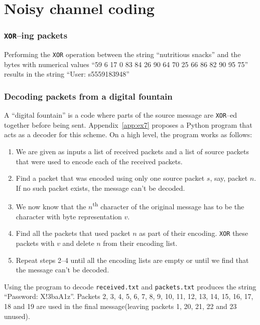 \documentclass[10pt,a4paper,oneside,onecolumn]{article}
\newcommand*{\receivedTXT}{{\tt received.txt}\xspace}
\newcommand*{\packetsTXT}{{\tt packets.txt}\xspace}
\newcommand*{\XOR}{{\tt XOR}\xspace}
\begin{document}
\part{Noisy channel coding}


\section{\XOR--ing packets}\label{sec:ex6}

Performing the \XOR operation between the string ``nutritious snacks'' and the
bytes with numerical values ``59 6 17 0 83 84 26 90 64 70 25 66 86 82 90 95 75''
results in the string ``User: s5559183948''


\section{Decoding packets from a digital fountain}\label{sec:ex7}

A ``digital fountain'' is a code where parts of the source message are \XOR--ed
together before being sent. Appendix~\ref{app:ex7} proposes a Python program
that acts as a decoder for this scheme. On a high level, the program works as
follows:

\begin{enumerate}
\item We are given as inputs a list of received packets and a list of source
      packets that were used to encode each of the received packets.
\item Find a packet that was encoded using only one source packet $s$, say,
      packet $n$.  If no such packet exists, the message can't be decoded.
\item We now know that the $n$\textsuperscript{th} character of the original
      message has to be the character with byte representation $v$.
\item Find all the packets that used packet $n$ as part of their encoding.
      \XOR these packets with $v$ and delete $n$ from their encoding list.
\item Repeat steps 2--4 until all the encoding lists are empty or until we find
      that the message can't be decoded.
\end{enumerate}

Using the program to decode \receivedTXT and \packetsTXT produces the string
``Password: X!3baA1z''. Packets 2, 3, 4, 5, 6, 7, 8, 9, 10, 11, 12, 13, 14, 15,
16, 17, 18 and 19 are used in the final message(leaving packets 1, 20, 21, 22
and 23 unused).
\end{document}
